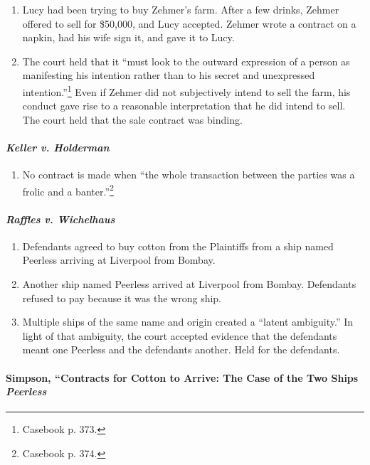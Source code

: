 \begin{enumerate}
    \item Lucy had been trying to buy Zehmer's farm. After a few drinks, 
    Zehmer offered to sell for \$50,000, and Lucy accepted. Zehmer wrote a 
    contract on a napkin, had his wife sign it, and gave it to Lucy.
    \item The court held that it ``must look to the outward expression of a 
    person as manifesting his intention rather than to his secret and 
    unexpressed intention.''\footnote{Casebook p. 373.} Even if Zehmer did not 
    subjectively intend to sell the farm, his conduct gave rise to a 
    reasonable interpretation that he did intend to sell. The court held that 
    the sale contract was binding.
\end{enumerate}

\paragraph{\emph{Keller v. Holderman}}

\begin{enumerate}
    \item No contract is made when ``the whole transaction between the parties 
    was a frolic and a banter.''\footnote{Casebook p. 374.}
\end{enumerate}

\paragraph{\emph{Raffles v. Wichelhaus}}

\begin{enumerate}
    \item Defendants agreed to buy cotton from the Plaintiffs from a ship 
    named Peerless arriving at Liverpool from Bombay.
    \item Another ship named Peerless arrived at Liverpool from Bombay. 
    Defendants refused to pay because it was the wrong ship.
    \item Multiple ships of the same name and origin created a ``latent 
    ambiguity.'' In light of that ambiguity, the court accepted evidence that 
    the defendants meant one Peerless and the defendants another. Held for the 
    defendants.
\end{enumerate}

\paragraph{Simpson, ``Contracts for Cotton to Arrive: The Case of the Two 
Ships \emph{Peerless}}

